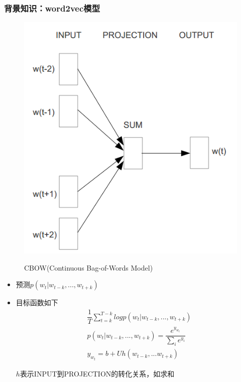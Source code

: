 \documentclass[notheorems]{beamer}
\begin{document}
\begin{frame}
\frametitle{背景知识：word2vec模型}
 \begin{minipage}[t]{0.4\linewidth}
 \centering
     \begin{figure}
      \scalebox{0.30}
      {
        \includegraphics{./figure/CBOW.png}
      }
      \caption{CBOW(Continuous Bag-of-Words Model)}
    \end{figure}
 \end{minipage}%
\begin{minipage}[t]{0.5\linewidth}
\centering
\begin{itemize}
\item 预测$p(w_{t}|w_{t-k},...,w_{t+k})$
\item 目标函数如下
\begin{equation}
\begin{aligned}
& \dfrac{1}{T}\sum_{t=k}^{T-k}logp(w_{t}|w_{t-k},...,w_{t+k})\\
& p(w_{t}|w_{t-k},...,w_{t+k})=\dfrac{e^{y_{w_{t}}}}{\sum_{i}e^{y_{i}}}\\
& y_{w_{t}}=b + Uh(w_{t-k},...w_{t+k})
\end{aligned}
\end{equation}
\begin{footnotesize}
$h$表示INPUT到PROJECTION的转化关系，如求和
\end{footnotesize}
\end{itemize}
\end{minipage}     
\end{frame}
\end{document}
